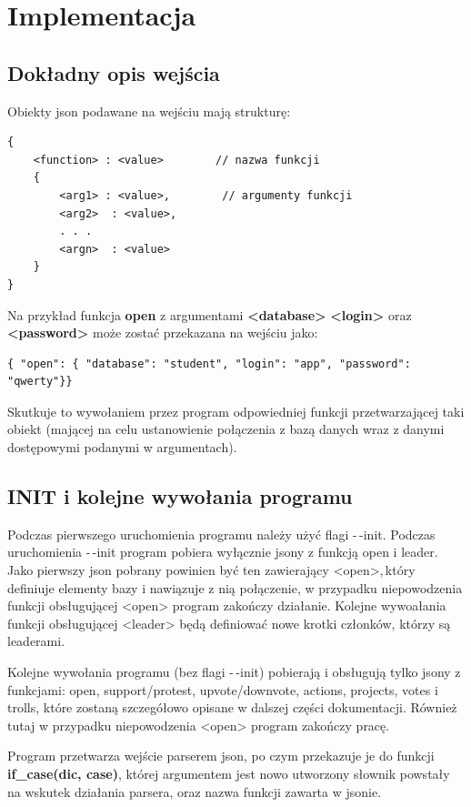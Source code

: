 \documentclass{article}
\begin{document}
\newpage
\section{Implementacja}




\subsection{Dokładny opis wejścia } 
Obiekty json podawane na wejściu mają strukturę: 
\begin{verbatim}
{     
    <function> : <value>        // nazwa funkcji 
    {
        <arg1> : <value>,        // argumenty funkcji
        <arg2>  : <value>, 
        . . . 
        <argn>  : <value> 
    }
}
\end{verbatim}
Na przykład funkcja \textbf{open} z argumentami \textbf{<database>} \textbf{<login>} oraz \textbf{<password>} może zostać przekazana na wejściu jako:
\begin{verbatim}
{ "open": { "database": "student", "login": "app", "password": "qwerty"}}
\end{verbatim}
Skutkuje to wywołaniem przez program odpowiedniej funkcji przetwarzającej taki obiekt (mającej na celu ustanowienie połączenia z bazą danych wraz z danymi dostępowymi podanymi w argumentach).




\subsection{INIT i kolejne wywołania programu}
Podczas pierwszego uruchomienia programu należy użyć flagi -\,-init.
Podczas uruchomienia -\,-init program pobiera wyłącznie jsony z funkcją open i leader.
Jako pierwszy json pobrany powinien być ten zawierający <open>,\,który definiuje elementy bazy i nawiązuje z nią połączenie,
w przypadku niepowodzenia funkcji obsługującej <open> program zakończy działanie. \newline
Kolejne wywoałania funkcji obsługującej <leader> będą definiować nowe krotki członków, którzy są leaderami. 

Kolejne wywołania programu (bez flagi -\,-init) pobierają i obsługują tylko jsony z funkcjami: 
open, support/protest, upvote/downvote, actions, projects, votes i trolls, 
które zostaną szczegółowo opisane w dalszej części dokumentacji.
Również tutaj w przypadku niepowodzenia <open> program zakończy pracę. 

Program przetwarza wejście parserem json, po czym przekazuje je do funkcji \textbf{if\_case(dic, case)}, 
której argumentem jest nowo utworzony słownik powstały na wskutek działania parsera, oraz nazwa funkcji zawarta w jsonie.
\end{document}

